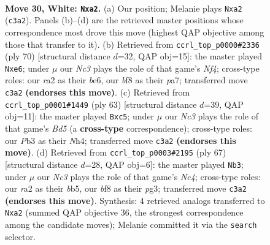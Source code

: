 \documentclass[11pt]{article}
\begin{document}
\clearpage

\begin{figure}[p]\centering
\begin{subfigure}{0.46\textwidth}\centering
\resizebox{\linewidth}{!}{%
\newchessgame
\chessboard[
  setfen={5b2/3k4/3n2p1/2pP4/4P3/1PNK4/r7/8 w - - 0 30},
  showmover=false,
  pgfstyle=straightmove, color=movearrow, markmove={c3-a2}
]}
\caption{}
\end{subfigure}\hfill
\begin{subfigure}{0.46\textwidth}\centering
\resizebox{\linewidth}{!}{%
\newchessgame
\chessboard[
  setfen={8/p7/4b2k/2p5/1p3N2/n2P1P2/3K2P1/8 w - - 0 36},
  showmover=false,
  pgfstyle=straightmove, color=movearrow, markmove={f4-e6}
]}
\caption{}
\end{subfigure}
\\[4pt]
\begin{subfigure}{0.46\textwidth}\centering
\resizebox{\linewidth}{!}{%
\newchessgame
\chessboard[
  setfen={8/8/p5pk/2R5/2NbPp1n/1B6/P6P/5K2 b - - 2 32},
  showmover=false,
  pgfstyle=straightmove, color=movearrow, markmove={d4-c5}
]}
\caption{}
\end{subfigure}\hfill
\begin{subfigure}{0.46\textwidth}\centering
\resizebox{\linewidth}{!}{%
\newchessgame
\chessboard[
  setfen={b4k2/5p2/4p2p/1Bn1P3/5N1P/4K1P1/8/8 b - - 1 34},
  showmover=false,
  pgfstyle=straightmove, color=movearrow, markmove={c5-b3}
]}
\caption{}
\end{subfigure}
\caption{\textbf{Move 30, White: \texttt{Nxa2}.} (a) Our position; Melanie plays \texttt{Nxa2} (\texttt{c3a2}). Panels (b)--(d) are the retrieved master positions whose correspondence most drove this move (highest QAP objective among those that transfer to it). (b) Retrieved from \texttt{ccrl\_top\_p0000\#2336} (ply 70) [structural distance $d$=32, QAP obj=15]: the master played \texttt{Nxe6}; under $\mu$ our \emph{Nc3} plays the role of that game's \emph{Nf4}; cross-type roles: our \emph{r}a2 as their \emph{b}e6, our \emph{b}f8 as their \emph{p}a7; transferred move \texttt{c3a2} \textbf{(endorses this move)}. (c) Retrieved from \texttt{ccrl\_top\_p0001\#1449} (ply 63) [structural distance $d$=39, QAP obj=11]: the master played \texttt{Bxc5}; under $\mu$ our \emph{Nc3} plays the role of that game's \emph{Bd5} (a \textbf{cross-type} correspondence); cross-type roles: our \emph{P}b3 as their \emph{N}h4; transferred move \texttt{c3a2} \textbf{(endorses this move)}. (d) Retrieved from \texttt{ccrl\_top\_p0003\#2195} (ply 67) [structural distance $d$=28, QAP obj=6]: the master played \texttt{Nb3}; under $\mu$ our \emph{Nc3} plays the role of that game's \emph{Nc4}; cross-type roles: our \emph{r}a2 as their \emph{b}b5, our \emph{b}f8 as their \emph{p}g3; transferred move \texttt{c3a2} \textbf{(endorses this move)}. Synthesis: 4 retrieved analogs transferred to \texttt{Nxa2} (summed QAP objective 36, the strongest correspondence among the candidate moves); Melanie committed it via the \texttt{search} selector.}
\label{fig:thought-m58}
\end{figure}
\end{document}
